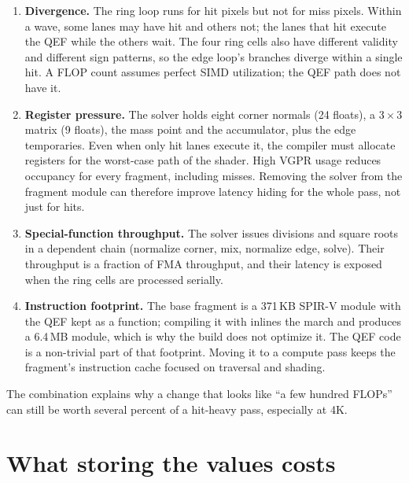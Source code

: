 \documentclass[11pt,a4paper]{article}
\newcommand{\code}[1]{\texttt{\detokenize{#1}}}
\theoremstyle{plain}
\theoremstyle{definition}
\theoremstyle{remark}
\begin{document}
\begin{enumerate}[leftmargin=1.4em,itemsep=2pt]
\item \textbf{Divergence.} The ring loop runs for hit pixels but not for miss
      pixels. Within a wave, some lanes may have hit and others not; the
      lanes that hit execute the QEF while the others wait. The four ring
      cells also have different validity and different sign patterns, so the
      edge loop's branches diverge within a single hit. A FLOP count assumes
      perfect SIMD utilization; the QEF path does not have it.
\item \textbf{Register pressure.} The solver holds eight corner normals (24
      floats), a $3\times3$ matrix (9 floats), the mass point and the
      accumulator, plus the edge temporaries. Even when only hit lanes execute
      it, the compiler must allocate registers for the worst-case path of the
      shader. High VGPR usage reduces occupancy for every fragment, including
      misses. Removing the solver from the fragment module can therefore
      improve latency hiding for the whole pass, not just for hits.
\item \textbf{Special-function throughput.} The solver issues divisions and
      square roots in a dependent chain (normalize corner, mix, normalize
      edge, solve). Their throughput is a fraction of FMA throughput, and
      their latency is exposed when the ring cells are processed serially.
\item \textbf{Instruction footprint.} The base fragment is a 371\,KB SPIR-V
      module with the QEF kept as a function; compiling it with \code{-O}
      inlines the march and produces a 6.4\,MB module, which is why the build
      does not optimize it. The QEF code is a non-trivial part of that
      footprint. Moving it to a compute pass keeps the fragment's instruction
      cache focused on traversal and shading.
\end{enumerate}

The combination explains why a change that looks like ``a few hundred FLOPs''
can still be worth several percent of a hit-heavy pass, especially at 4K.

\section{What storing the values costs}
\end{document}
